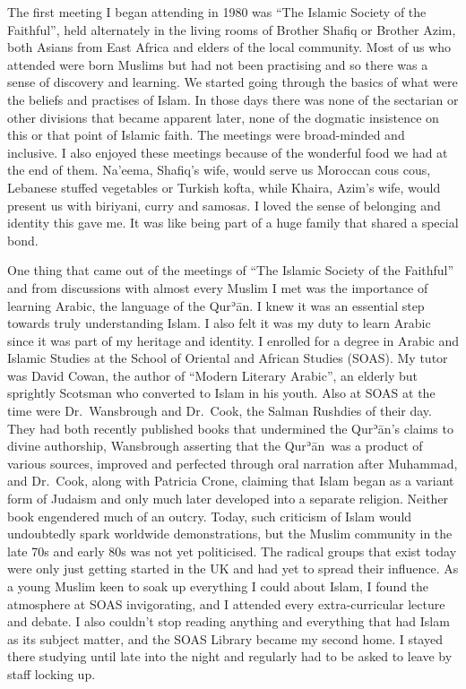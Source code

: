 \documentclass[12pt]{memoir}
\def\´{ʾ} %
\newcommand{\cmt}[2]{#1} %
\def \Quran{Qur\-\´ān} %
\begin{document}
The first meeting I began attending in 1980 was
“The Islamic Society of the Faithful”,
held alternately in the living rooms of Brother Shafiq or Brother Azim,
both Asians from East Africa and elders of the local community.
Most of us who attended were born Muslims but had not been practising
and so there was a sense of discovery and learning.
We started going through the basics of what were the beliefs
and practises of Islam.
In those days there was none of \cmt{the sectarian}{sectarianism?}
or other divisions that became apparent later,
none of the dogmatic insistence on this or that point of Islamic faith.
The meetings were broad-minded and inclusive.
I also enjoyed these meetings because of the wonderful food
we had at the end of them.
Na’eema, Shafiq’s wife, would serve us Moroccan \cmt{cous cous}{couscous?},
Lebanese stuffed vegetables or Turkish kofta, while Khaira, Azim’s wife,
would present us with \cmt{biriyani}{biryani?}, curry and samosas.
I loved the sense of belonging and identity this gave me.
It was like being part of a huge family that shared a special bond.

One thing that came out of the meetings of
“The Islamic Society of the Faithful”
and from discussions with almost every Muslim I met
was the importance of learning Arabic, the language of the \Quran.
I knew it was an essential step towards truly understanding Islam.
I also felt it was my duty to learn Arabic
since it was part of my heritage and identity.
I enrolled for a degree in Arabic and Islamic Studies
at the School of Oriental and African Studies (SOAS).
My tutor was David Cowan, the author of “Modern Literary Arabic”,
an elderly but sprightly Scotsman who converted to Islam in his youth.
Also at SOAS at the time were Dr.\ Wansbrough and Dr.\ Cook,
the Salman Rushdies of their day.
They had both recently published books that undermined
the \Quran’s claims to divine authorship,
Wansbrough asserting that the \Quran\ was a product of various sources,
improved and perfected through oral narration after Muhammad,
and Dr.\ Cook, along with Patricia Crone,
claiming that Islam began as a variant form of Judaism
and only much later developed into a separate religion.
Neither book engendered much of an outcry.
Today, such criticism of Islam would undoubtedly
spark worldwide demonstrations,
but the Muslim community in the late 70s and early 80s was not yet politicised.
The radical groups that exist today were only just getting started in the UK
and had yet to spread their influence.
As a young Muslim keen to soak up everything I could about Islam,
I found the atmosphere at SOAS invigorating,
and I attended every extra-curricular lecture and debate.
I also couldn’t stop reading anything
and everything that had Islam as its subject matter,
and the SOAS Library became my second home.
I stayed there studying until late into the night
and regularly had to be asked to leave by staff locking up.
\end{document}
